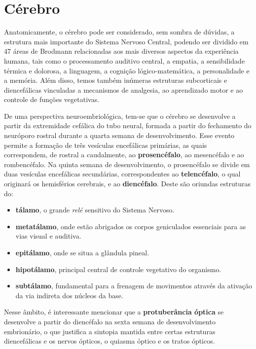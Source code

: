 \documentclass[
]{book}
\providecommand{\tightlist}{%
  \setlength{\itemsep}{0pt}\setlength{\parskip}{0pt}}
\begin{document}
\hypertarget{cuxe9rebro}{%
\chapter{Cérebro}\label{cuxe9rebro}}

Anatomicamente, o cérebro pode ser considerado, sem sombra de dúvidas, a estrutura mais importante do Sistema Nervoso Central, podendo ser dividido em 47 áreas de Brodmann relacionadas aos mais diversos aspectos da experiência humana, tais como o processamento auditivo central, a empatia, a sensibilidade térmica e dolorosa, a linguagem, a cognição lógico-matemática, a personalidade e a memória. Além disso, temos também inúmeras estruturas subcorticais e diencefálicas vinculadas a mecanismos de analgesia, ao aprendizado motor e ao controle de funções vegetativas.

De uma perspectiva neuroembriológica, tem-se que o cérebro se desenvolve a partir da extremidade cefálica do tubo neural, formada a partir do fechamento do neuróporo rostral durante a quarta semana de desenvolvimento. Esse evento permite a formação de três vesículas encefálicas primárias, as quais correspondem, de rostral a caudalmente, ao \textbf{prosencéfalo}, ao mesencéfalo e ao rombencéfalo. Na quinta semana de desenvolvimento, o prosencéfalo se divide em duas vesículas encefálicas secundárias, correspondentes ao \textbf{telencéfalo}, o qual originará os hemisférios cerebrais, e ao \textbf{diencéfalo}. Deste são oriundas estruturas do:

\begin{itemize}
\tightlist
\item
  \textbf{tálamo}, o grande \emph{relé} sensitivo do Sistema Nervoso.
\item
  \textbf{metatálamo}, onde estão abrigados os corpos geniculados essenciais para as vias visual e auditiva.
\item
  \textbf{epitálamo}, onde se situa a glândula pineal.
\item
  \textbf{hipotálamo}, principal central de controle vegetativo do organismo.
\item
  \textbf{subtálamo}, fundamental para a frenagem de movimentos através da ativação da via indireta dos núcleos da base.
\end{itemize}

Nesse âmbito, é interessante mencionar que a \textbf{protuberância óptica} se desenvolve a partir do diencéfalo na sexta semana de desenvolvimento embrionário, o que justifica a sintopia mantida entre certas estruturas diencefálicas e os nervos ópticos, o quiasma óptico e os tratos ópticos.
\end{document}
